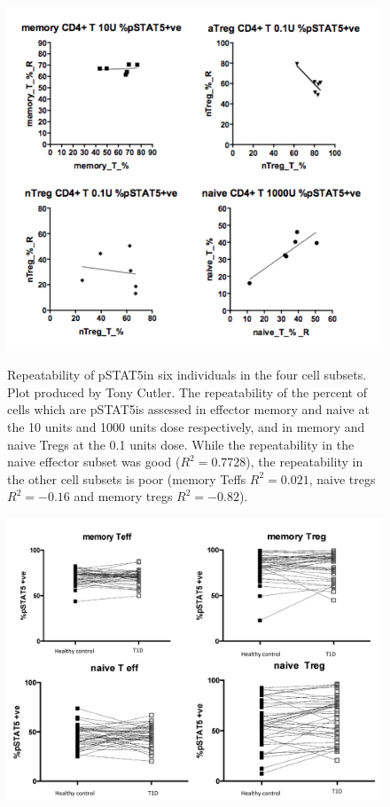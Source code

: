 \begin{figure}
\centering
\begin{minipage}{.65\textwidth}
\includegraphics[width=\linewidth]{figures/tony-repeatability}
\end{minipage}
\begin{minipage}{\textwidth}
{ Repeatability of pSTAT5\positive in six individuals in the four cell subsets. }
{
    Plot produced by Tony Cutler.
    The repeatability of the percent of cells which are pSTAT5\positive is assessed in effector memory and naive at the 10 units and 1000 units dose respectively, and in memory and naive Tregs at the 0.1 units dose.
    While the repeatability in the naive effector subset was good ($R^2=0.7728$), the repeatability in the other cell subsets is poor (memory Teffs $R^2=0.021$, naive tregs $R^2=-0.16$ and memory tregs $R^2=-0.82$).
}
\end{minipage}
\begin{minipage}{.65\textwidth}
\includegraphics[width=\linewidth]{figures/tony-t1d-association}

\end{minipage}
\end{figure}

